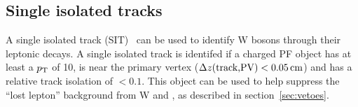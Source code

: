 \subsection{Single isolated tracks\label{recSIT}}

A single isolated track (SIT)~\cite{singleleptonstop} can be used to 
identify W bosons through their leptonic decays. A single isolated track 
is identifed if a charged PF object has at least a $p_{\mathrm{T}}$ of 10\gev, 
is near the primary vertex ($\Delta z (\textrm{track,PV}) <0.05\,\text{cm}$) 
and has a relative track isolation of $<0.1$. This object can be
used to help suppress the ``lost lepton'' background from W and
\ttbar, as described in section~\ref{sec:vetoes}. 


